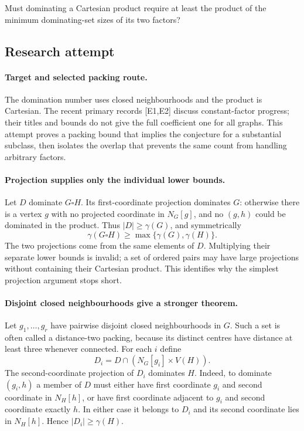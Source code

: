 \documentclass[11pt,a4paper]{article}
\begin{document}
Must dominating a Cartesian product require at least the product of the minimum dominating-set sizes of its two factors?

\subsection{Research attempt}

\paragraph{Target and selected packing route.}
The domination number uses closed neighbourhoods and the product is
Cartesian. The recent primary records [E1,E2] discuss constant-factor
progress; their titles and bounds do not give the full coefficient one
for all graphs. This attempt proves a packing bound that implies the
conjecture for a substantial subclass, then isolates the overlap that
prevents the same count from handling arbitrary factors.

\paragraph{Projection supplies only the individual lower bounds.}
Let $D$ dominate $G\square H$. Its first-coordinate projection
dominates $G$: otherwise there is a vertex $g$ with no projected
coordinate in $N_G[g]$, and no $(g,h)$ could be dominated in the
product. Thus $|D|\ge\gamma(G)$, and symmetrically
\[
                 \gamma(G\square H)\ge\max\{\gamma(G),\gamma(H)\}.
\]
The two projections come from the same elements of $D$. Multiplying
their separate lower bounds is invalid; a set of ordered pairs may
have large projections without containing their Cartesian product.
This identifies why the simplest projection argument stops short.

\paragraph{Disjoint closed neighbourhoods give a stronger theorem.}
Let $g_1,\ldots,g_r$ have pairwise disjoint closed neighbourhoods
in $G$. Such a set is often called a distance-two packing, because
its distinct centres have distance at least three whenever connected.
For each $i$ define
\[
            D_i=D\cap(N_G[g_i]\times V(H)).
\]
The second-coordinate projection of $D_i$ dominates $H$. Indeed,
to dominate $(g_i,h)$ a member of $D$ must either have first
coordinate $g_i$ and second coordinate in $N_H[h]$, or have first
coordinate adjacent to $g_i$ and second coordinate exactly $h$.
In either case it belongs to $D_i$ and its second coordinate lies
in $N_H[h]$. Hence $|D_i|\ge\gamma(H)$.
\end{document}
